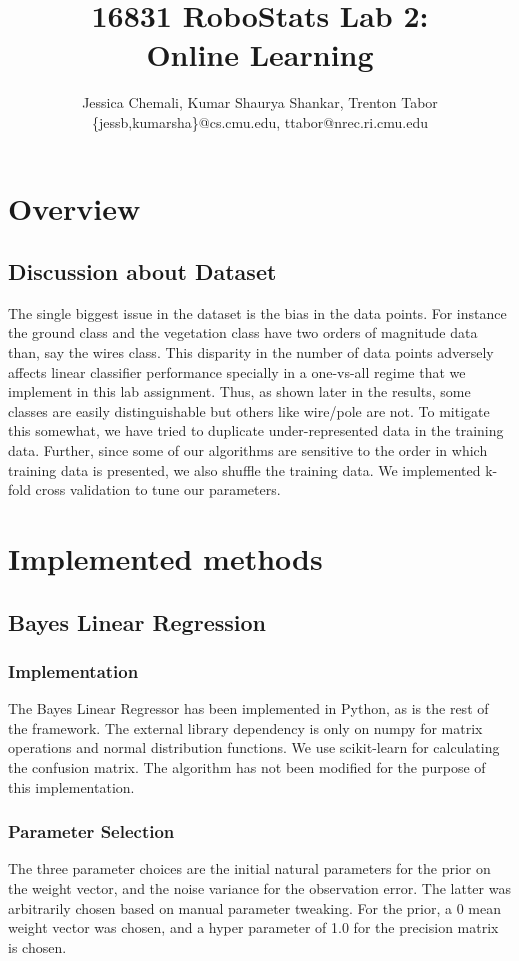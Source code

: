 \documentclass[10pt,a4paper]{article}
\author{Jessica Chemali, Kumar Shaurya Shankar, Trenton Tabor\\ \{jessb,kumarsha\}@cs.cmu.edu, ttabor@nrec.ri.cmu.edu}
\title{16831 RoboStats Lab 2: \\Online Learning}
\begin{document}
\maketitle
\section{Overview}
\subsection{Discussion about Dataset}
The single biggest issue in the dataset is the bias in the data points. For instance the ground class and the vegetation class have two orders of magnitude data than, say the wires class. This disparity in the number of data points adversely affects linear classifier performance specially in a one-vs-all regime that we implement in this lab assignment. Thus, as shown later in the results, some classes are easily distinguishable but others like wire/pole are not. To mitigate this somewhat, we have tried to duplicate under-represented data in the training data. Further, since some of our algorithms are sensitive to the order in which training data is presented, we also shuffle the training data. We implemented k-fold cross validation to tune our parameters.
\section{Implemented methods}
\subsection{Bayes Linear Regression}
\subsubsection{Implementation}
The Bayes Linear Regressor has been implemented in Python, as is the rest of the framework. The external library dependency is only on numpy for matrix operations and normal distribution functions. We use scikit-learn for calculating the confusion matrix. The algorithm has not been modified for the purpose of this implementation.
\subsubsection{Parameter Selection}
The three parameter choices are the initial natural parameters for the prior on the weight vector, and the noise variance for the observation error. The latter was arbitrarily chosen based on manual parameter tweaking. For the prior, a 0 mean weight vector was chosen, and a hyper parameter of 1.0 for the precision matrix is chosen.
\end{document}
